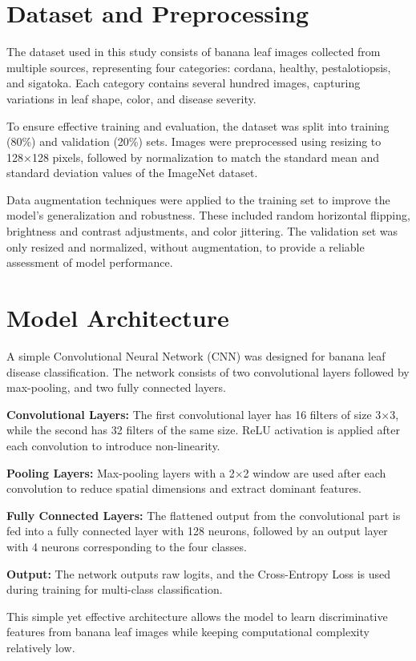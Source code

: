 \documentclass[11pt]{article}
\begin{document}
\section{Dataset and Preprocessing}
The dataset used in this study consists of banana leaf images collected from multiple sources, representing four categories: cordana, healthy, pestalotiopsis, and sigatoka. Each category contains several hundred images, capturing variations in leaf shape, color, and disease severity.

To ensure effective training and evaluation, the dataset was split into training (80\%) and validation (20\%) sets. Images were preprocessed using resizing to 128×128 pixels, followed by normalization to match the standard mean and standard deviation values of the ImageNet dataset.

Data augmentation techniques were applied to the training set to improve the model’s generalization and robustness. These included random horizontal flipping, brightness and contrast adjustments, and color jittering. The validation set was only resized and normalized, without augmentation, to provide a reliable assessment of model performance.

\section{Model Architecture}
A simple Convolutional Neural Network (CNN) was designed for banana leaf disease classification. The network consists of two convolutional layers followed by max-pooling, and two fully connected layers.

\textbf{Convolutional Layers:} The first convolutional layer has 16 filters of size 3×3, while the second has 32 filters of the same size. ReLU activation is applied after each convolution to introduce non-linearity.

\textbf{Pooling Layers:} Max-pooling layers with a 2×2 window are used after each convolution to reduce spatial dimensions and extract dominant features.

\textbf{Fully Connected Layers:} The flattened output from the convolutional part is fed into a fully connected layer with 128 neurons, followed by an output layer with 4 neurons corresponding to the four classes.

\textbf{Output:} The network outputs raw logits, and the Cross-Entropy Loss is used during training for multi-class classification.

This simple yet effective architecture allows the model to learn discriminative features from banana leaf images while keeping computational complexity relatively low.
\end{document}
